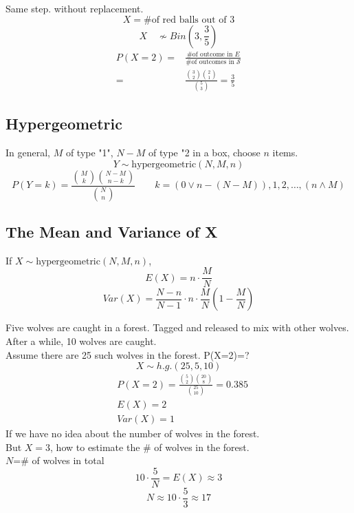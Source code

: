 \begin{exmp}
Same step. without replacement.
\[X= \text{\# of red balls out of 3}\]
\[X \quad  \not\sim  Bin\left(3,\frac{3}{5}\right)\]
\begin{align*}
P(X=2)=& \frac{\text{\# of outcome in } E}{\text{\# of outcomes in } \mathcal{S}} \\
=& \frac{\binom 32 \binom 21}{\binom 53} =\frac{3}{5}
\end{align*}
\end{exmp}

\subsection{Hypergeometric}
\begin{prop}
In general, $M$ of type "1", $N-M$ of type "2 in a box, choose $n$ items.
\[Y \sim \text{hypergeometric}(N,M,n)\]
\[P(Y=k)=\frac{\binom Mk \binom {N-M}{n-k}}{\binom N n}\qquad k=(0 \vee n-(N-M)),1,2,\dots,(n \wedge M)\]
\end{prop}

\subsection{The Mean and Variance of X}
\begin{prop}
If $X \sim \text{hypergeometric}(N,M,n)$,
\[E(X)=n \cdot \frac{M}{N}\]
\[Var(X)=\frac{N-n}{N-1}\cdot n \cdot\frac{M}{N}\left(1-\frac{M}{N}\right)\]
\end{prop}


\begin{exmp}
Five wolves are caught in a forest. Tagged and released to mix with other wolves. After a while, 10 wolves are caught.\\
Assume there are 25 such wolves in the forest. P(X=2)=?
\[X \sim h.g.(25,5,10)\]
\begin{align*}
&P(X=2)=\frac{\binom 52 \binom {20}{8}}{\binom {25}{10}}=0.385 \\
&E(X)=2	\\
&Var(X)=1
\end{align*}
If we have no idea about the number of wolves in the forest.\\
But $X=3$, how to estimate the \# of wolves in the forest.\\
$N$=\# of wolves in total
\[10 \cdot \frac{5}{N}=E(X)\approx 3\]
\[N \approx 10 \cdot \frac{5}{3}\approx17\]
\end{exmp}



